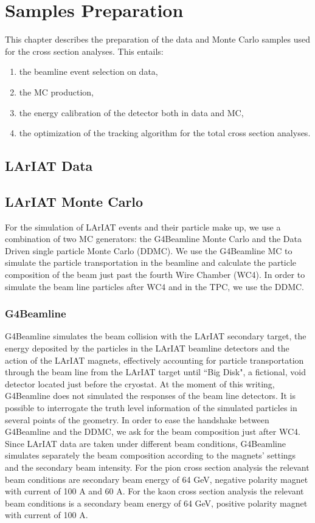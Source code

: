 \chapter{Samples Preparation}\label{ch:samples}
This chapter describes the preparation of the data and Monte Carlo samples used for the cross section analyses. This entails:
\begin{enumerate}
\item the beamline event selection on data,
\item the MC production,
\item the energy calibration of the detector both in data and MC,
\item the optimization of the tracking algorithm for the total cross section analyses.
\end{enumerate}

\section{LArIAT Data}
\section{LArIAT Monte Carlo}
For the simulation of LArIAT events and their particle make up, we use a combination of two MC generators: the G4Beamline Monte Carlo and the Data Driven single particle Monte Carlo (DDMC). We use the G4Beamline MC to simulate the particle transportation in the beamline and calculate the particle composition of the beam just past the fourth Wire Chamber (WC4). In order to simulate the beam line particles after WC4 and in the TPC, we use the DDMC.
\subsection{G4Beamline}\label{beamlineComposition}
G4Beamline simulates the beam collision with the LArIAT secondary target, the energy deposited by the particles in the LArIAT beamline detectors and the action of the LArIAT magnets, effectively accounting for particle transportation through the beam line from the LArIAT target until ``Big Disk", a fictional, void detector located just before the cryostat. 
 At the moment of this writing, G4Beamline does not simulated the responses of the beam line detectors. It is possible to interrogate the truth level information of the simulated particles in several points of the geometry. In order to ease the handshake between G4Beamline and the DDMC, we ask for the beam composition just after WC4.
Since LArIAT data are taken under different beam conditions, G4Beamline simulates separately the beam composition according to the magnets' settings and the secondary beam intensity. For the pion cross section analysis the relevant beam conditions are  secondary beam energy of 64 GeV, negative polarity magnet with current of 100 A and 60 A. For the kaon cross section analysis the relevant beam conditions is a secondary beam energy of 64 GeV, positive polarity magnet with current of 100 A. 

